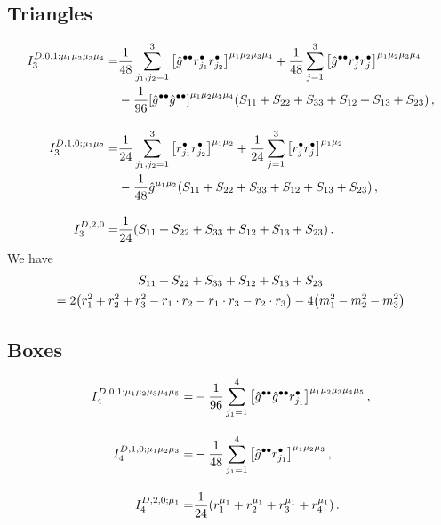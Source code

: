 \documentclass[11pt,a4paper]{refrep}
\begin{document}
\subsection*{Triangles}
\begin{subequations}
\begin{align}
  I_3^{D,0,1;\mu_1\mu_2\mu_3\mu_4} =& \frac{1}{48}\sum_{j_1,j_2=1}^3\qty[\hat{g}^{\bullet\bullet}r_{j_1}^\bullet r_{j_2}^\bullet]^{\mu_1\mu_2\mu_3\mu_4} + \frac{1}{48}\sum_{j=1}^3\qty[\hat{g}^{\bullet\bullet}r_j^\bullet r_j^\bullet]^{\mu_1\mu_2\mu_3\mu_4}\notag\\
    &-\frac{1}{96}\qty[\hat{g}^{\bullet\bullet}\hat{g}^{\bullet\bullet}]^{\mu_1\mu_2\mu_3\mu_4}\qty(S_{11}+S_{22}+S_{33}+S_{12}+S_{13}+S_{23})\,,\\[10pt]
%
  I_3^{D,1,0;\mu_1\mu_2} =& \frac{1}{24}\sum_{j_1,j_2=1}^3\qty[r_{j_1}^\bullet r_{j_2}^\bullet]^{\mu_1\mu_2} + \frac{1}{24}\sum_{j=1}^3\qty[r_j^\bullet r_j^\bullet]^{\mu_1\mu_2}\notag\\
    &-\frac{1}{48}\hat{g}^{\mu_1\mu_2}\qty(S_{11}+S_{22}+S_{33}+S_{12}+S_{13}+S_{23})\,,\\[10pt]
%
  I_3^{D,2,0} =& \frac{1}{24}\qty(S_{11}+S_{22}+S_{33}+S_{12}+S_{13}+S_{23})\,.
\end{align}
\end{subequations}
We have
\begin{multline}
  S_{11}+S_{22}+S_{33}+S_{12}+S_{13}+S_{23} \\= 2\qty(r_1^2+r_2^2+r_3^2-r_1\cdot r_2-r_1\cdot r_3-r_2\cdot r_3)-4\qty(m_1^2-m_2^2-m_3^2)
\end{multline}

\subsection*{Boxes}
\begin{subequations}
\begin{align}
  I_4^{D,0,1;\mu_1\mu_2\mu_3\mu_4\mu_5} =& -\frac{1}{96}\sum_{j_1=1}^4\qty[\hat{g}^{\bullet\bullet}\hat{g}^{\bullet\bullet}r_{j_1}^\bullet]^{\mu_1\mu_2\mu_3\mu_4\mu_5}\,,\\[10pt]
%
  I_4^{D,1,0;\mu_1\mu_2\mu_3} =& -\frac{1}{48}\sum_{j_1=1}^4\qty[\hat{g}^{\bullet\bullet}r_{j_1}^\bullet]^{\mu_1\mu_2\mu_3}\,,\\[10pt]
%
  I_4^{D,2,0;\mu_1} =& \frac{1}{24}\qty(r_1^{\mu_1}+r_2^{\mu_1}+r_3^{\mu_1}+r_4^{\mu_1})\,.
\end{align}
\end{subequations}
\end{document}
